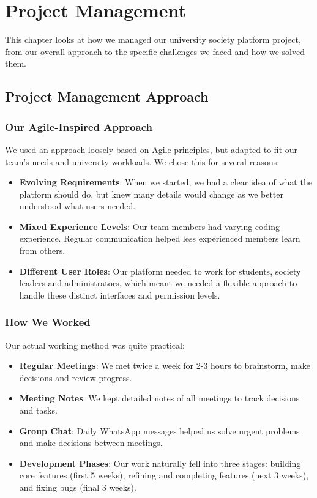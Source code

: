 \chapter{Project Management}
\label{chap:project-management}

This chapter looks at how we managed our university society platform project, from our overall approach to the specific challenges we faced and how we solved them.

\section{Project Management Approach}

\subsection{Our Agile-Inspired Approach}

We used an approach loosely based on Agile principles, but adapted to fit our team's needs and university workloads. We chose this for several reasons:

\begin{itemize}
    \item \textbf{Evolving Requirements}: When we started, we had a clear idea of what the platform should do, but knew many details would change as we better understood what users needed.
    
    \item \textbf{Mixed Experience Levels}: Our team members had varying coding experience. Regular communication helped less experienced members learn from others.
    
    \item \textbf{Different User Roles}: Our platform needed to work for students, society leaders and administrators, which meant we needed a flexible approach to handle these distinct interfaces and permission levels.
\end{itemize}

\subsection{How We Worked}

Our actual working method was quite practical:

\begin{itemize}
    \item \textbf{Regular Meetings}: We met twice a week for 2-3 hours to brainstorm, make decisions and review progress.
    
    \item \textbf{Meeting Notes}: We kept detailed notes of all meetings to track decisions and tasks.
    
    \item \textbf{Group Chat}: Daily WhatsApp messages helped us solve urgent problems and make decisions between meetings.
    
    \item \textbf{Development Phases}: Our work naturally fell into three stages: building core features (first 5 weeks), refining and completing features (next 3 weeks), and fixing bugs (final 3 weeks).
\end{itemize}


